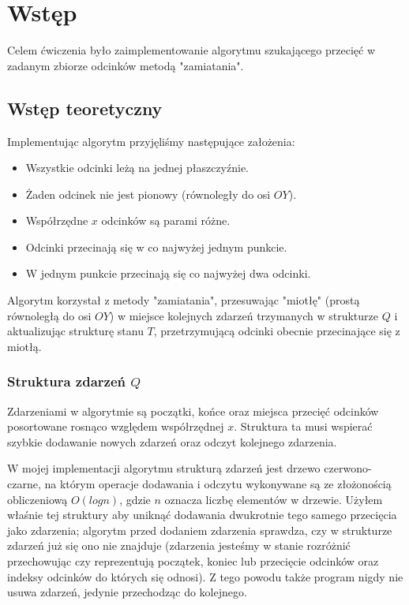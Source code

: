 \documentclass[11pt,a4paper]{article}
\begin{document}
\section{Wstęp}
Celem ćwiczenia było zaimplementowanie algorytmu
szukającego przecięć w zadanym zbiorze odcinków
metodą "zamiatania".

\subsection{Wstęp teoretyczny}
Implementując algorytm przyjęliśmy następujące założenia:
\begin{itemize}
    \item Wszystkie odcinki leżą na jednej płaszczyźnie.
    \item Żaden odcinek nie jest pionowy (równoległy do osi $OY$).
    \item Współrzędne $x$ odcinków są parami różne.
    \item Odcinki przecinają się w co najwyżej jednym punkcie.
    \item W jednym punkcie przecinają się co najwyżej dwa odcinki.
\end{itemize}

Algorytm korzystał z metody "zamiatania", 
przesuwając "miotłę" (prostą równoległą do osi $OY$)
w miejsce kolejnych zdarzeń trzymanych w strukturze $Q$
i aktualizując strukturę stanu $T$, przetrzymującą odcinki
obecnie przecinające się z miotłą.

\subsubsection{Struktura zdarzeń $Q$}
Zdarzeniami w algorytmie są początki, końce oraz miejsca
przecięć odcinków posortowane rosnąco względem współrzędnej $x$.
Struktura ta musi wspierać szybkie dodawanie nowych zdarzeń oraz
odczyt kolejnego zdarzenia.

W mojej implementacji algorytmu strukturą zdarzeń jest
drzewo czerwono-czarne, na którym operacje dodawania i odczytu
wykonywane są ze złożonością obliczeniową $O(logn)$, gdzie $n$ 
oznacza liczbę elementów w drzewie. Użyłem właśnie tej struktury
aby uniknąć dodawania dwukrotnie tego samego przecięcia jako zdarzenia;
algorytm przed dodaniem zdarzenia sprawdza, czy w strukturze zdarzeń
już się ono nie znajduje (zdarzenia jesteśmy w stanie rozróżnić
przechowując czy reprezentują początek, koniec lub przecięcie odcinków 
oraz indeksy odcinków do których się odnosi). 
Z tego powodu także program nigdy nie usuwa zdarzeń, 
jedynie przechodząc do kolejnego.
\end{document}
